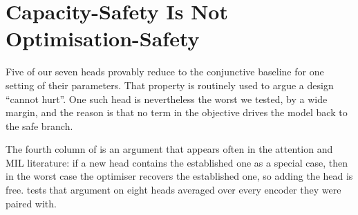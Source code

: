 %

\section{Capacity-Safety Is Not Optimisation-Safety}
\label{sec:safety}

\begin{finding}
\label{find:safety}
Five of our seven heads provably reduce to the conjunctive baseline for one setting of their
parameters. That property is routinely used to argue a design ``cannot hurt''. One such head is
nevertheless the worst we tested, by a wide margin, and the reason is that no term in the objective
drives the model back to the safe branch.
\end{finding}

The fourth column of  is an argument that appears often in the attention and MIL
literature: if a new head contains the established one as a special case, then in the worst case the
optimiser recovers the established one, so adding the head is free.  tests that
argument on eight heads averaged over every encoder they were paired with.

